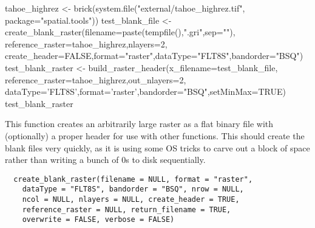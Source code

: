 \documentclass[a4paper]{book}
\begin{document}
%
\begin{Examples}
\begin{ExampleCode}
tahoe_highrez <- brick(system.file("external/tahoe_highrez.tif", package="spatial.tools"))
test_blank_file <- create_blank_raster(filename=paste(tempfile(),".gri",sep=""),
	reference_raster=tahoe_highrez,nlayers=2,
	create_header=FALSE,format="raster",dataType="FLT8S",bandorder="BSQ")
test_blank_raster <- build_raster_header(x_filename=test_blank_file,
	reference_raster=tahoe_highrez,out_nlayers=2,
	dataType='FLT8S',format='raster',bandorder="BSQ",setMinMax=TRUE)
test_blank_raster
\end{ExampleCode}
\end{Examples}
%
\begin{Description}\relax
This function creates an arbitrarily large raster as a
flat binary file with (optionally) a proper header for
use with other functions.  This should create the blank
files very quickly, as it is using some OS tricks to
carve out a block of space rather than writing a bunch of
0s to disk sequentially.
\end{Description}
%
\begin{Usage}
\begin{verbatim}
  create_blank_raster(filename = NULL, format = "raster",
    dataType = "FLT8S", bandorder = "BSQ", nrow = NULL,
    ncol = NULL, nlayers = NULL, create_header = TRUE,
    reference_raster = NULL, return_filename = TRUE,
    overwrite = FALSE, verbose = FALSE)
\end{verbatim}
\end{Usage}
%
\end{document}
